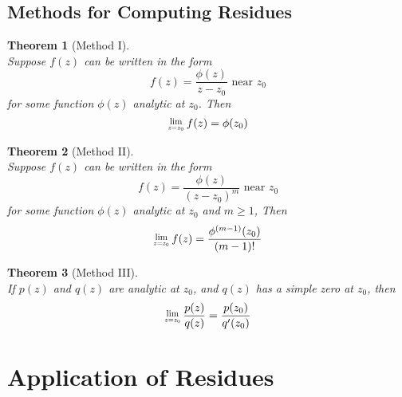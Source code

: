 \documentclass[12pt]{article}
\newcommand{\Res}[1]{\raisebox{0.5ex}{\scalebox{0.8}{$\displaystyle \lim_{#1}\;$}}}
\newtheorem{theorem}{Theorem}[section]
\theoremstyle{definition}
\begin{document}
\subsection{Methods for Computing Residues}
\begin{theorem}[Method I]
\hfill\\\normalfont Suppose $f(z)$ can be written in the form
\[
f(z)=\frac{\phi(z)}{z-z_0}\text{ near }z_0
\]
for some function $\phi(z)$ analytic at $z_0$. Then
\[
\Res{z=z_0}f(z)=\phi(z_0)
\]
\end{theorem}
\begin{theorem}[Method II]
\hfill\\\normalfont Suppose $f(z)$ can be written in the form
\[
f(z)=\frac{\phi(z)}{(z-z_0)^m}\text{ near }z_0
\]
for some function $\phi(z)$ analytic at $z_0$ and $m\geq 1$, Then
\[
\Res{z=z_0}f(z)=\frac{\phi^{(m-1)}(z_0)}{(m-1)!}
\]
\end{theorem}
\begin{theorem}[Method III]
\hfill\\\normalfont If $p(z)$ and $q(z)$ are analytic at $z_0$, and $q(z)$ has a simple zero at $z_0$, then
\[
\Res{z=z_0}\frac{p(z)}{q(z)} = \frac{p(z_0)}{q'(z_0)}
\]
\end{theorem}
\clearpage
\section{Application of Residues}
\end{document}
